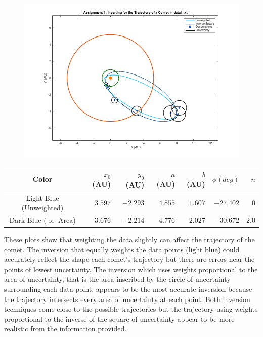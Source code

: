 \documentclass[12pt,runningheads]{article}
\begin{document}
\pagebreak
\begin{figure}[!h]
\includegraphics[width=\textwidth]{Trajectory1.png}
\end{figure}
\begin{center}
\begin{tabular}{|c|rrrrrr|}
\hline
Color & $x_{0}$ (AU) & $y_{0}$ (AU) & $a$ (AU) & $b$ (AU) & $\phi(deg)$ & $n$ \\
\hline
\rule{0pt}{3ex} Light Blue (Unweighted)& $3.597$ & $-2.293$ & $4.855$ & $1.607$ & $-27.402$ & $0$\\
Dark Blue ($\propto$ Area) & $3.676$ & $-2.214$ & $4.776$ & $2.027$ & $-30.672$ & $2.0$ \\
\hline
\end{tabular}
\end{center}

These plots show that weighting the data slightly can affect the trajectory of the comet. The inversion that equally weights the data points (light blue) could accurately reflect the shape each comet's trajectory but there are errors near the points of lowest uncertainty. The inversion which uses weights proportional to the area of uncertainty, that is the area inscribed by the circle of uncertainty surrounding each data point, appears to be the most accurate inversion because the trajectory intersects every area of uncertainty at each point. Both inversion techniques come close to the possible trajectories but the trajectory using weights proportional to the inverse of the square of uncertainty appear to be more realistic from the information provided.

\pagebreak
\end{document}
